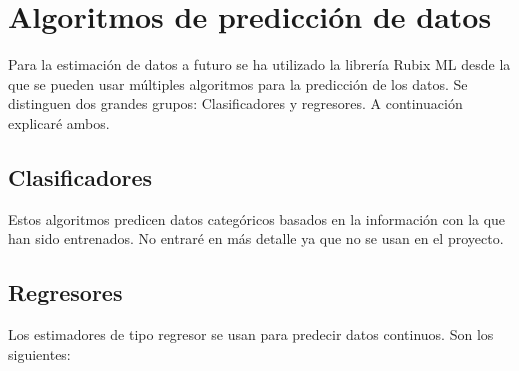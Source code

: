 \section{Algoritmos de predicción de datos}
Para la estimación de datos a futuro se ha utilizado la librería Rubix ML desde la que se pueden usar múltiples algoritmos para la predicción de los datos. Se distinguen dos grandes grupos: Clasificadores y regresores. A continuación explicaré ambos.
\subsection{Clasificadores}
Estos algoritmos predicen datos categóricos basados en la información con la que han sido entrenados. No entraré en más detalle ya que no se usan en el proyecto.
\subsection{Regresores}
Los estimadores de tipo regresor se usan para predecir datos continuos. Son los siguientes:
